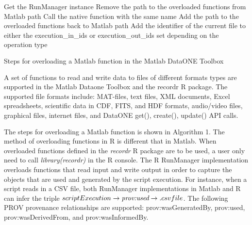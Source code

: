 \documentclass[runningheads,a4paper]{llncs}
\begin{document}
{\begin{algorithm}
\DontPrintSemicolon 
{}
Get the RunManager instance\;
Remove the path to the overloaded functions from Matlab path\;
Call the native function with the same name\;
Add the path to the overloaded functions back to Matlab path\;
Add the identifier of the current file to either the execution\_in\_ids or execution\_out\_ids set depending on the operation type \;  
\;

\caption{Steps for overloading a Matlab function in the Matlab DataONE Toolbox}
\label{algo:overloadFunctions}
\end{algorithm}

A set of functions to read and write data to files of different formats types are supported in the Matlab Dataone Toolbox and the recordr R package. The supported file formats include: MAT-files, text files, XML documents, Excel spreadsheets, scientific data in CDF, FITS, and HDF formats, audio/video files, graphical files, internet files, and DataONE get(), create(), update() API calls. 

The steps for overloading a Matlab function is shown in Algorithm 1. The method of overloading functions in R is different that in Matlab. When overloaded functions defined in the \emph{recordr} R package are to be used, a user only need to call \emph{library(recordr)} in the R console.  The R RunManager implementation overloads functions that read input and write output in order to capture the objects that are used and generated by the script execution. For instance, when a script reads in a CSV file, both RunManager implementations in Matlab and R can infer the triple $scriptExecution \rightarrow \emph{prov:used} \rightarrow .csv file$. The following PROV \cite{prov} provenance relationships are supported: prov:wasGeneratedBy, prov:used, prov:wasDerivedFrom, and prov:wasInformedBy.



}
\end{document}
